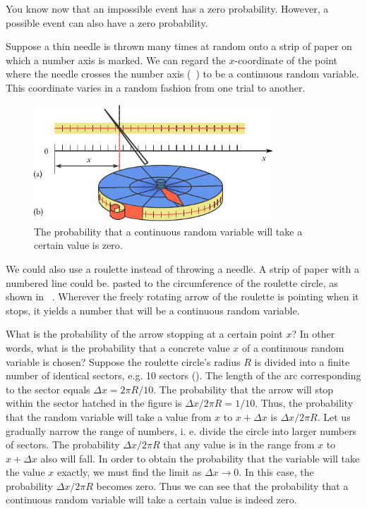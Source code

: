  You know
now that an impossible event has a zero probability. However, a
possible event can also have a zero probability.

Suppose a thin needle is thrown many times at random onto a strip
of paper on which a number axis is marked. We can regard the
$x$-coordinate of the point where the needle crosses the number axis
(~) to be a continuous random variable. This coordinate varies in a random fashion from one trial to another.

\begin{figure}[!h]
 \centering
 \includegraphics[width=0.8\textwidth]{figures/needle.pdf}
\caption{The probability that a continuous random variable will take a
  certain value is zero.\label{needle}}
 \end{figure}
We could also use a roulette instead of throwing a needle. A strip of
paper with a numbered line could be. pasted to the circumference of
the roulette circle, as shown in ~. Wherever the freely
rotating arrow of the roulette is pointing when it stops, it yields a
number that will be a continuous random variable.

What is the probability of the arrow stopping at a certain point $x$?
In other words, what is the probability that a concrete value $x$ of a
continuous random variable is chosen? Suppose the roulette
circle's radius $R$ is divided into a finite number of identical
sectors, e.g. 10 sectors (). The length of the
arc corresponding to the sector equals $\Delta x = 2 \pi R/10$. The
probability that the arrow will stop within the sector hatched in the
figure is $\Delta x / 2 \pi R = 1/10$. Thus, the probability that the
random variable will take a value from $x$ to $x + \Delta x$ is
$\Delta x / 2 \pi R $. Let us gradually narrow the range of numbers,
i. e. divide the circle into larger numbers of sectors. The
probability $\Delta x / 2 \pi R $ that any value is in the range from
$x$ to $x + \Delta x$ also will fall. In order to obtain the
probability that the variable will take the value $x$ exactly, we must
find the limit as $\Delta x \to 0 $. In this case, the probability
$\Delta x / 2 \pi R $ becomes zero.  Thus we can see that the
probability that a continuous random variable will take a certain
value is indeed zero.

